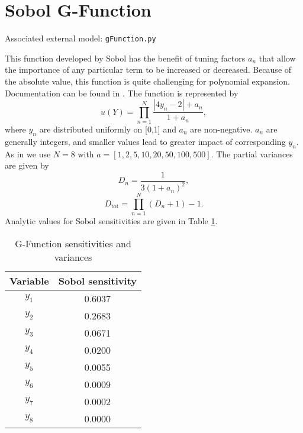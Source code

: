 %
%
%
%
%
%
\section{Sobol G-Function}
Associated external model: \texttt{gFunction.py}

This function developed by Sobol has the benefit of tuning factors $a_n$ that allow the importance of any
particular term to be increased or decreased.  Because of the absolute value, this function is quite
challenging for polynomial expansion.  Documentation can be found in \cite{sobol2003}.  The function is
represented by
\begin{equation}
  u(Y) = \prod_{n=1}^N \frac{|4y_n - 2|+a_n}{1+a_n},
\end{equation}
where $y_n$ are distributed uniformly on [0,1] and $a_n$ are non-negative.  $a_n$ are generally integers, and
smaller values lead to greater impact of corresponding $y_n$.  As in \cite{sudret2007} we use $N=8$ with
$a=[1,2,5,10,20,50,100,500]$.  The partial variances are given by
\begin{equation}
  D_n = \frac{1}{3(1+a_n)^2},
\end{equation}
\begin{equation}
  D_\text{tot} = \prod_{n=1}^N (D_n+1)-1.
\end{equation}
Analytic values for Sobol sensitivities are given in Table \ref{tab:gfunc sens}.
\begin{table}[h]
  \centering
  \begin{tabular}{c|c}
    Variable & Sobol sensitivity \\ \hline
    $y_1$ & 0.6037 \\
    $y_2$ & 0.2683 \\
    $y_3$ & 0.0671 \\
    $y_4$ & 0.0200 \\
    $y_5$ & 0.0055 \\
    $y_6$ & 0.0009 \\
    $y_7$ & 0.0002 \\
    $y_8$ & 0.0000 \\
  \end{tabular}
  \caption{G-Function sensitivities and variances}
  \label{tab:gfunc sens}
\end{table}
